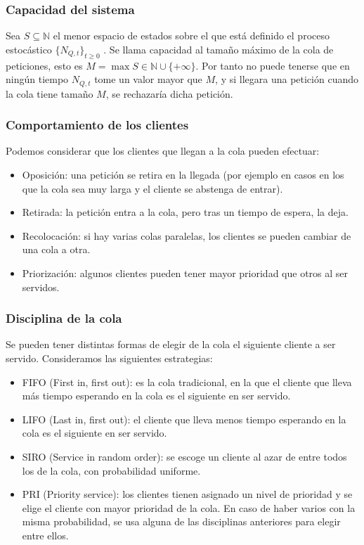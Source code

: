 \documentclass[8pt]{beamer}
\begin{document}
  \begin{frame}\frametitle{Capacidad del sistema}
    Sea $S\subseteq \mathbb{N}$ el menor espacio de estados sobre el que está definido el proceso estocástico $\{N_{Q,t}\}_{t\ge 0}$ . 
    Se llama capacidad al tamaño máximo de la cola de peticiones, esto es $M = \max S \in \mathbb{N} \cup \{+\infty\}$. 
    Por tanto no puede tenerse que en ningún tiempo $N_{Q,t}$ tome un valor mayor que $M$, y si llegara una
    petición cuando la cola tiene tamaño $M$, se rechazaría dicha petición.
  \end{frame}
  \begin{frame}\frametitle{Comportamiento de los clientes}
    Podemos considerar que los clientes que llegan a la cola pueden efectuar:

    \begin{itemize}
    \item Oposición: una petición se retira en la llegada (por ejemplo en casos en los que la cola sea muy larga
      y el cliente se abstenga de entrar).
    \item Retirada: la petición entra a la cola, pero tras un tiempo de espera, la deja.
    \item Recolocación: si hay varias colas paralelas, los clientes se pueden cambiar de una cola a otra.
    \item Priorización: algunos clientes pueden tener mayor prioridad que otros al ser servidos.
    \end{itemize}

  \end{frame}
  \begin{frame}\frametitle{Disciplina de la cola}
    Se pueden tener distintas formas de elegir de la cola el siguiente cliente a ser servido. Consideramos las siguientes estrategias:
    \begin{itemize}
    \item FIFO (First in, first out): es la cola tradicional, en la que el cliente que lleva más tiempo esperando en la cola es el siguiente en ser servido.
    \item LIFO (Last in, first out): el cliente que lleva menos tiempo esperando en la cola es el siguiente en ser servido.
    \item SIRO (Service in random order): se escoge un cliente al azar de entre todos los de la cola, con probabilidad uniforme.
    \item PRI (Priority  service): los clientes tienen asignado un nivel de prioridad y se elige el cliente con mayor prioridad de la cola. En caso de haber varios con la misma probabilidad, se usa alguna de las disciplinas anteriores para elegir entre ellos.
    \end{itemize}

  \end{frame}
\end{document}
